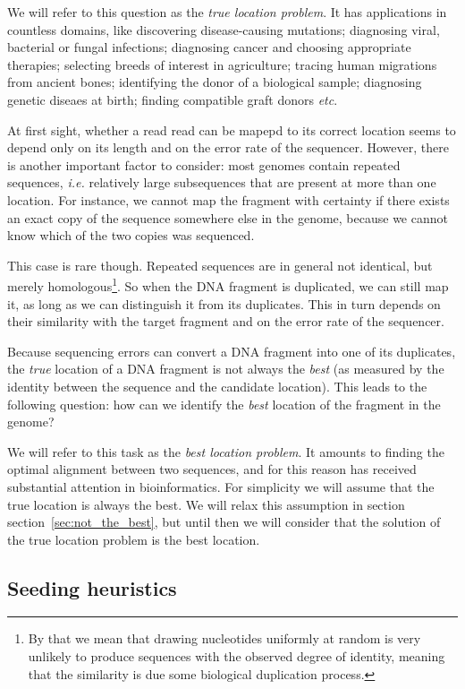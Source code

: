\documentclass{article}
\begin{document}
We will refer to this question as the \emph{true location problem}.
It has applications in countless domains, like discovering
disease-causing mutations; diagnosing viral, bacterial or fungal
infections; diagnosing cancer and choosing appropriate therapies;
selecting breeds of interest in agriculture; tracing human migrations from
ancient bones; identifying the donor of a biological sample; diagnosing
genetic diseaes at birth; finding compatible graft donors \textit{etc}.

At first sight, whether a read read can be mapepd to its correct location
seems to depend only on its length and on the error rate of the sequencer.
However, there is another important factor to consider: most genomes
contain repeated sequences, \textit{i.e.} relatively large subsequences
that are present at more than one location. For instance, we cannot map
the fragment with certainty if there exists an exact copy of the sequence
somewhere else in the genome, because we cannot know which of the two
copies was sequenced.

This case is rare though. Repeated sequences are in general not identical,
but merely homologous\footnote{By that we mean that drawing nucleotides
uniformly at random is very unlikely to produce sequences with the
observed degree of identity, meaning that the similarity is due some
biological duplication process.}. So when the DNA fragment is duplicated,
we can still map it, as long as we can distinguish it from its duplicates.
This in turn depends on their similarity with the target fragment and on
the error rate of the sequencer.

Because sequencing errors can convert a DNA fragment into one of its
duplicates, the \emph{true} location of a DNA fragment is not always the
\emph{best} (as measured by the identity between the sequence and the
candidate location). This leads to the following question: how can we
identify the \emph{best} location of the fragment in the genome? 

We will refer to this task as the \emph{best location problem}. It amounts
to finding the optimal alignment between two sequences, and for this
reason has received substantial attention in bioinformatics. For
simplicity we will assume that the true location is always the best. We
will relax this assumption in section section~\ref{sec:not_the_best}, but
until then we will consider that the solution of the true location problem
is the best location.


\subsection{Seeding heuristics}
\label{sec:seedheur}
\end{document}
